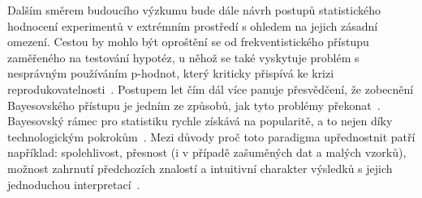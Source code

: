 Dalším směrem budoucího výzkumu bude dále návrh postupů statistického hodnocení
experimentů v extrémním prostředí s ohledem na jejich zásadní omezení. Cestou by
mohlo být oproštění se od frekventistického přístupu zaměřeného na testování
hypotéz, u něhož se také vyskytuje problém s nesprávným používáním p-hodnot,
který kriticky přispívá ke krizi
reprodukovatelnosti~\cite{Chambers2014,Szucs2016}. Postupem let čím dál více
panuje přesvědčení, že zobecnění Bayesovského přístupu je jedním ze způsobů, jak
tyto problémy překonat~\cite{Benjamin2018}. Bayesovský rámec pro statistiku
rychle získává na popularitě, a to nejen díky technologickým
pokrokům~\cite{Winkler2001,Ferreira2020}. Mezi důvody proč toto paradigma
upřednostnit patří například: spolehlivost, přesnost (i v případě zašuměných dat
a malých vzorků), možnost zahrnutí předchozích znalostí a intuitivní charakter
výsledků s jejich jednoduchou
interpretací~\cite{Etz2016,Kruschke2012,Kruschke2010,Winkler2001}. 